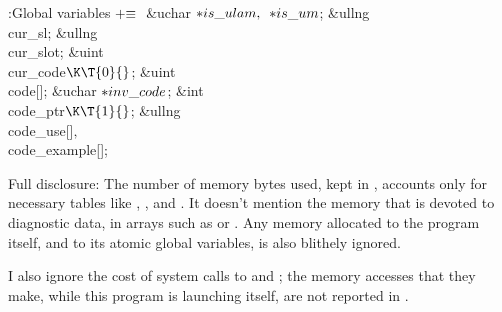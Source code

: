 \Y\B\4:Global variables\X${}\mathrel+\equiv{}$\6
\&{uchar} ${}{*}\\{is\_ulam},{}$ ${}{*}\\{is\_um}{}$;\6
\&{ullng} \\{cur\_sl};\6
\&{ullng} \\{cur\_slot};\6
\&{uint} \\{cur\_code}${}\K\T{0}{}$;\6
\&{uint} \\{code}[];\6
\&{uchar} ${}{*}\\{inv\_code}{}$;\6
\&{int} \\{code\_ptr}${}\K\T{1}{}$;\6
\&{ullng} \\{code\_use}[]${},{}$ \\{code\_example}[];\par
\fi

Full disclosure:
The number of memory bytes used, kept in , accounts only
for necessary tables like , , and . It doesn't
mention the memory that is devoted to diagnostic data, in arrays
such as  or . Any memory allocated to
the program itself, and to its atomic global variables,
is also blithely ignored.

I also ignore the cost of system calls to  and ;
the memory accesses that they make, while this program is
launching itself, are not reported in .

